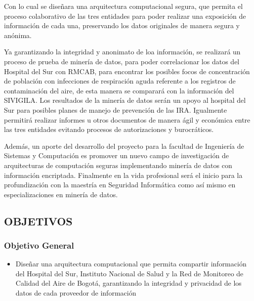 \documentclass[a4paper, 11pt, oneside]{article}
\theoremstyle{definition}
\theoremstyle{remark}
\begin{document}
Con lo cual se diseñara una arquitectura computacional segura, que permita el proceso colaborativo de las tres entidades para poder realizar una exposición de información de cada una, preservando los datos originales de manera segura y anónima.

Ya garantizando la integridad y anonimato de loa información, se realizará un proceso de prueba de minería de datos, para poder correlacionar los datos del Hospital del Sur con RMCAB, para encontrar los posibles focos de concentración de población con infecciones de respiración aguda referente a los registros de contaminación del aire, de esta manera se comparará con la información del SIVIGILA. Los resultados de la minería de datos serán un apoyo  al hospital del Sur para posibles planes de manejo de prevención de las IRA. Igualmente permitirá realizar informes u otros documentos de manera ágil y económica entre las tres entidades evitando procesos de autorizaciones y burocráticos.

Además, un aporte del desarrollo del proyecto para la facultad de Ingeniería de Sistemas y Computación es promover un nuevo campo de investigación de arquitecturas de computación seguras implementando minería de datos con información encriptada. Finalmente en la vida profesional será el inicio para la profundización con la maestría en Seguridad Informática como así mismo en especializaciones en minería de datos.

\subsection{OBJETIVOS}

\subsubsection{Objetivo General}
\begin{itemize}
\item Diseñar una arquitectura computacional que permita compartir información del Hospital del Sur, Instituto Nacional de Salud y la Red de Monitoreo de Calidad del Aire de Bogotá, garantizando la integridad y privacidad de los datos de cada proveedor de información
\end{itemize}
\end{document}
